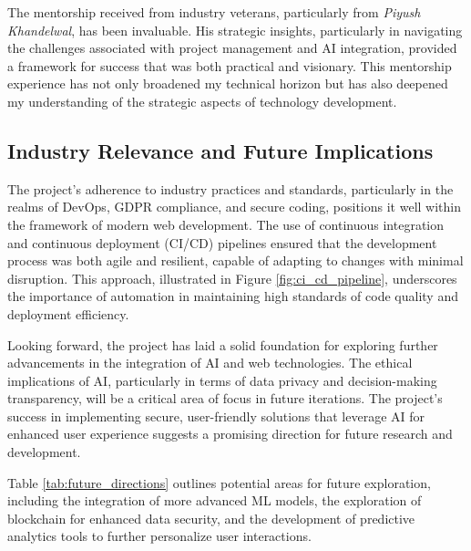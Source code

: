 The mentorship received from industry veterans, particularly from \textit{Piyush Khandelwal}, has been invaluable. His strategic insights, particularly in navigating the challenges associated with project management and \gls{AI} integration, provided a framework for success that was both practical and visionary. This mentorship experience has not only broadened my technical horizon but has also deepened my understanding of the strategic aspects of technology development.

\subsection{Industry Relevance and Future Implications}
The project's adherence to industry practices and standards, particularly in the realms of \gls{DevOps}, \gls{GDPR} compliance, and secure coding, positions it well within the framework of modern web development. The use of continuous integration and continuous deployment (CI/CD) pipelines ensured that the development process was both agile and resilient, capable of adapting to changes with minimal disruption. This approach, illustrated in Figure \ref{fig:ci_cd_pipeline}, underscores the importance of automation in maintaining high standards of code quality and deployment efficiency.


Looking forward, the project has laid a solid foundation for exploring further advancements in the integration of \gls{AI} and web technologies. The ethical implications of AI, particularly in terms of data privacy and decision-making transparency, will be a critical area of focus in future iterations. The project's success in implementing secure, user-friendly solutions that leverage AI for enhanced user experience suggests a promising direction for future research and development.

Table \ref{tab:future_directions} outlines potential areas for future exploration, including the integration of more advanced \gls{ML} models, the exploration of blockchain for enhanced data security, and the development of predictive analytics tools to further personalize user interactions.


